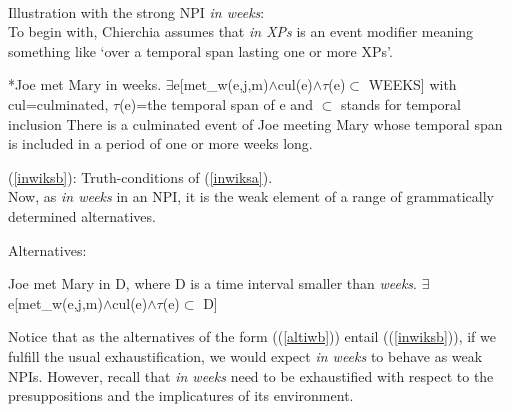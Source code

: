 \documentclass[a4paper,11pt]{article}
\newcommand{\reff}[1]{(\ref{#1})}
\begin{document}
\paragraph{}
Illustration with the strong NPI \textit{in weeks}:
\\To begin with, Chierchia assumes that \textit{in XPs} is an event modifier meaning something like `over a temporal span lasting one or more XPs'.
\begin{exe}
\ex\label{inwiks} \begin{xlist}
\ex\label{inwiksa} *Joe met Mary in weeks.
\ex\label{inwiksb} $\exists$e[met_w(e,j,m)$\wedge$cul(e)$\wedge\tau$(e)$\subset$ WEEKS] with cul=culminated, $\tau$(e)=the temporal span of e and $\subset$ stands for temporal inclusion
\ex\label{inwiksc} There is a culminated event of Joe meeting Mary whose temporal span is included in a period of one or more weeks long.
\end{xlist}
\end{exe}
\reff{inwiksb}: Truth-conditions of \reff{inwiksa}.
\\Now, as \textit{in weeks} in an NPI, it is the weak element of a range of grammatically determined alternatives.
\begin{exe}
\ex\label{altiw} Alternatives: \begin{xlist}
\ex\label{altiwa} Joe met Mary in D, where D is a time interval smaller than \textit{weeks}.
\ex\label{altiwb} $\exists$e[met_w(e,j,m)$\wedge$cul(e)$\wedge\tau$(e)$\subset$ D]
\end{xlist}
\end{exe}
Notice that as the alternatives of the form (\reff{altiwb}) entail (\reff{inwiksb}), if we fulfill the usual exhaustification, we would expect \textit{in weeks} to behave as weak NPIs. However, recall that \textit{in weeks} need to be exhaustified with respect to the presuppositions and the implicatures of its environment.
\end{document}
